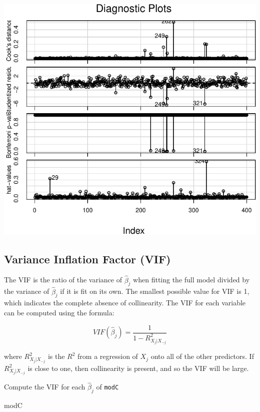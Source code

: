 \documentclass[
]{article}
\newenvironment{Shaded}{\begin{snugshade}}{\end{snugshade}}
\newcommand{\NormalTok}[1]{#1}
\begin{document}
\begin{center}\includegraphics{SDM-CHAP24_files/figure-latex/unnamed-chunk-4-3} \end{center}

\hypertarget{variance-inflation-factor-vif}{%
\subsection{Variance Inflation Factor (VIF)}\label{variance-inflation-factor-vif}}

The VIF is the ratio of the variance of \(\hat{\beta}_j\) when fitting the full model divided by the variance of \(\hat{\beta}_j\) if it is fit on its own. The smallest possible value for VIF is 1, which indicates the complete absence of collinearity. The VIF for each variable can be computed using the formula:

\[VIF(\hat{\beta}_j) = \frac{1}{1 - R^2_{X_j|X_{-j}}}\]

where \(R^2_{X_j|X_{-j}}\) is the \(R^2\) from a regression of \(X_j\) onto all of the other predictors. If \(R^2_{X_j|X_{-j}}\) is close to one, then collinearity is present, and so the VIF will be large.

Compute the VIF for each \(\hat{\beta}_j\) of \texttt{modC}

\begin{Shaded}
\begin{Highlighting}[]
\NormalTok{modC}
\end{Highlighting}
\end{Shaded}
\end{document}
